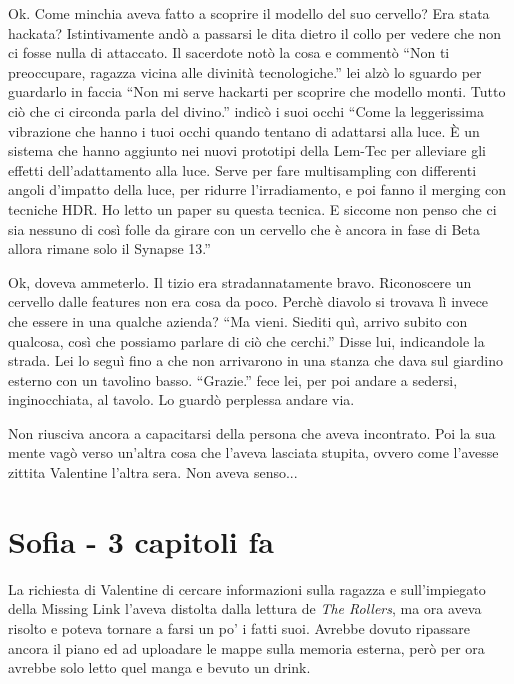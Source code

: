     Ok. Come minchia aveva fatto a scoprire il modello del suo cervello? Era stata hackata? Istintivamente andò a
    passarsi le dita dietro il collo per vedere che non ci fosse nulla di attaccato. Il sacerdote notò la cosa e
    commentò ``Non ti preoccupare, ragazza vicina alle divinità tecnologiche.'' lei alzò lo sguardo per guardarlo in
    faccia ``Non mi serve hackarti per scoprire che modello monti. Tutto ciò che ci circonda parla del divino.'' indicò
    i suoi occhi ``Come la leggerissima vibrazione che hanno i tuoi occhi quando tentano di adattarsi alla luce. È un
    sistema che hanno aggiunto nei nuovi prototipi della Lem-Tec per alleviare gli effetti dell'adattamento alla luce.
    Serve per fare multisampling con differenti angoli d'impatto della luce, per ridurre l'irradiamento, e poi fanno il
    merging con tecniche HDR. Ho letto un paper su questa tecnica. E siccome non penso che ci sia nessuno di così folle da girare con un cervello che è
    ancora in fase di Beta allora rimane solo il Synapse 13.''

    Ok, doveva ammeterlo. Il tizio era stradannatamente bravo. Riconoscere un cervello dalle features non era cosa da
    poco. Perchè diavolo si trovava lì invece che essere in una qualche azienda? ``Ma vieni. Siediti quì, arrivo subito
    con qualcosa, così che possiamo parlare di ciò che cerchi.'' Disse lui, indicandole la strada. Lei lo seguì fino a
    che non arrivarono in una stanza che dava sul giardino esterno con un tavolino basso. ``Grazie.'' fece lei, per poi
    andare a sedersi, inginocchiata, al tavolo. Lo guardò perplessa andare via.

    Non riusciva ancora a capacitarsi della persona che aveva incontrato. Poi la sua mente vagò verso un'altra cosa che
    l'aveva lasciata stupita, ovvero come l'avesse zittita Valentine l'altra sera. Non aveva senso...

  \section*{Sofia - 3 capitoli fa}

    La richiesta di Valentine di cercare informazioni sulla ragazza e sull'impiegato della Missing Link l'aveva
    distolta dalla lettura de \emph{The Rollers}, ma ora aveva risolto e poteva tornare a farsi un po' i fatti suoi.
    Avrebbe dovuto ripassare ancora il piano ed ad uploadare le mappe sulla memoria esterna, però per ora avrebbe solo
    letto quel manga e bevuto un drink.

